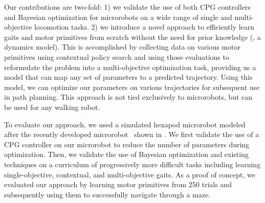 Our contributions are two-fold:
1) we validate the use of both CPG controllers and Bayesian optimization for microrobots on a wide range of single and multi-objective locomotion tasks.
2) we introduce a novel approach to efficiently learn gaits and motor primitives from scratch without the need for prior knowledge (\eg, a dynamics model).
This is accomplished by collecting data on various motor primitives using contextual policy search and using those evaluations to reformulate the problem into a multi-objective optimization task, providing us a model that can map any set of parameters to a predicted trajectory.
Using this model, we can optimize our parameters on various trajectories for subsequent use in path planning.
This approach is not tied exclusively to microrobots, but can be used for any walking robot.

To evaluate our approach, we used a simulated hexapod microrobot modeled after the recently developed microrobot~\citep{contreras_first_2017} shown in . 
We first validate the use of a CPG controller on our microrobot to reduce the number of parameters during optimization.
Then, we validate the use of Bayesian optimization and existing techniques on a curriculum of progressively more difficult tasks including learning single-objective, contextual, and multi-objective gaits.
As a proof of concept, we evaluated our approach by learning motor primitives from 250 trials and subsequently using them to successfully navigate through a maze.
